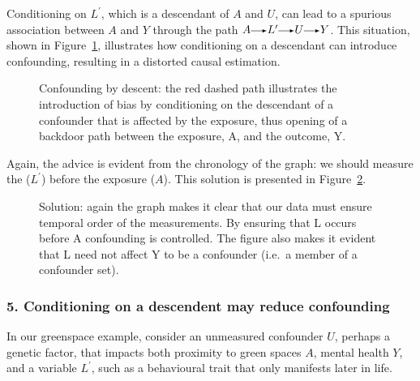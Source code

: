 \documentclass[
  singlecolumn]{article}
\renewcommand{\rightarrow}{\tikz[baseline=-0.5ex] \draw[-latex] (0,0) -- (0.5,0);}
\renewcommand{\to}{\rightarrow}
\begin{document}
Conditioning on \(L^\prime\), which is a descendant of \(A\) and \(U\),
can lead to a spurious association between \(A\) and \(Y\) through the
path \(A \to L^\prime \to U \to Y\). This situation, shown in
Figure~\ref{fig-dag-descendent}, illustrates how conditioning on a
descendant can introduce confounding, resulting in a distorted causal
estimation.

\begin{figure}


\caption{\label{fig-dag-descendent}Confounding by descent: the red
dashed path illustrates the introduction of bias by conditioning on the
descendant of a confounder that is affected by the exposure, thus
opening of a backdoor path between the exposure, A, and the outcome, Y.}

\end{figure}%

Again, the advice is evident from the chronology of the graph: we should
measure the (\(L^\prime\)) before the exposure (\(A\)). This solution is
presented in Figure~\ref{fig-dag-descendent-solution}.

\begin{figure}


\caption{\label{fig-dag-descendent-solution}Solution: again the graph
makes it clear that our data must ensure temporal order of the
measurements. By ensuring that L occurs before A confounding is
controlled. The figure also makes it evident that L need not affect Y to
be a confounder (i.e.~a member of a confounder set).}

\end{figure}%

\subsubsection{5. Conditioning on a descendent may reduce
confounding}\label{conditioning-on-a-descendent-may-reduce-confounding}

In our greenspace example, consider an unmeasured confounder \(U\),
perhaps a genetic factor, that impacts both proximity to green spaces
\(A\), mental health \(Y\), and a variable \(L^\prime\), such as a
behavioural trait that only manifests later in life.
\end{document}
